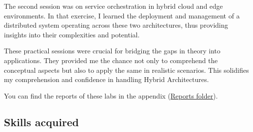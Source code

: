 The second session was on service orchestration in hybrid cloud and edge environments. In that exercise, I learned the deployment and management of a distributed system operating across these two architectures, thus providing insights into their complexities and potential.
\vspace{0.25cm}

These practical sessions were crucial for bridging the gaps in theory into applications. They provided me the chance not only to comprehend the conceptual aspects but also to apply the same in realistic scenarios. This solidifies my comprehension and confidence in handling Hybrid Architectures.
\vspace{0.25cm}

\noindent You can find the reports of these labs in the appendix (\href{https://github.com/Raspeur/Portfolio/tree/main/Reports}{Reports folder}).

\subsection{Skills acquired}

